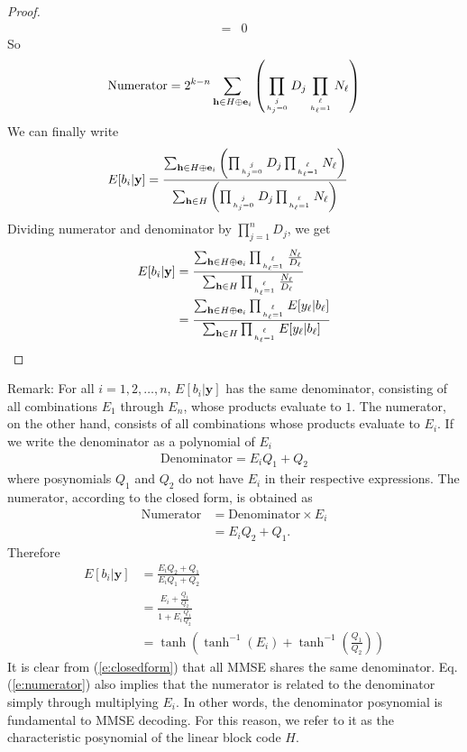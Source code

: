 \documentclass[12pt]{article}
\newcommand{\vect}[1]{\mathbf{#1}}
\begin{document}
\begin{proof}
\begin{align}
=&0
\end{align}
So
\begin{align}
\text{Numerator}=2^{k-n}\sum_{\vect{h}\in H\oplus\vect{e}_i}\left(\prod_{j\atop h_j = 0}D_j\prod_{\ell\atop h_\ell = 1} N_\ell\right)
\end{align}
We can finally write
\begin{align}
E[b_i|\vect{y}] &= \frac{\sum_{\vect{h}\in H\oplus\vect{e}_i}\left(\prod_{j\atop h_j = 0}D_j\prod_{\ell\atop h_\ell = 1} N_\ell\right)}{\sum_{\vect{h}\in H}\left(\prod_{j\atop h_j = 0}D_j\prod_{\ell\atop h_\ell = 1} N_\ell\right)}
\end{align}
Dividing numerator and denominator by $\prod_{j=1}^nD_j$, we get
\begin{align}
E[b_i|\vect{y}] &=\frac{\sum_{\vect{h}\in H\oplus\vect{e}_i}\prod_{\ell\atop h_\ell = 1} \frac{N_\ell}{D_\ell}}{\sum_{\vect{h}\in H}\prod_{\ell\atop h_\ell = 1} \frac{N_\ell}{D_\ell}}\\
&=\frac{\sum_{\vect{h}\in H\oplus\vect{e}_i}\prod_{\ell\atop h_\ell = 1} E[y_\ell|b_\ell]}{\sum_{\vect{h}\in H}\prod_{\ell\atop h_\ell = 1} E[y_\ell|b_\ell]}
\end{align}
\end{proof}
Remark: For all $i=1,2,\ldots,n$, $E[b_i|\vect{y}]$ has the same denominator, consisting of all combinations $E_1$ through $E_n$, whose products evaluate to $1$. The numerator, on the other hand, consists of all combinations whose products evaluate to $E_i$. If we write the denominator as a polynomial of $E_i$
\begin{align*}
\mathrm{Denominator}=E_iQ_1+Q_2
\end{align*}
where posynomials $Q_1$ and $Q_2$ do not have $E_i$ in their respective expressions. The numerator, according to the closed form, is obtained as
\begin{align}
\mathrm{Numerator} &= \mathrm{Denominator} \times E_i\label{e:numerator}\\
&=E_iQ_2 + Q_1.
\end{align}
Therefore
\begin{align*}
E[b_i|\vect{y}] &= \frac{E_iQ_2+Q_1}{E_iQ_1+Q_2}\\
&=\frac{E_i+\frac{Q_1}{Q_2}}{1+E_i\frac{Q_1}{Q_2}}\\
&=\tanh\left(\tanh^{-1}(E_i)+\tanh^{-1}\left(\frac{Q_1}{Q_2}\right)\right)
\end{align*}
It is clear from (\ref{e:closedform}) that all MMSE shares the same denominator. Eq. (\ref{e:numerator}) also implies that the numerator is related to the denominator simply through multiplying $E_i$. In other words, the denominator posynomial is fundamental to MMSE decoding. For this reason, we refer to it as the characteristic posynomial of the linear block code $H$.
\end{document}
